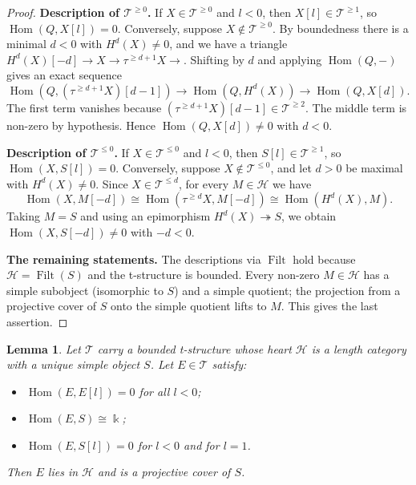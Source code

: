 \documentclass[11pt,reqno]{amsart}
\theoremstyle{plain}
\newtheorem{lemma}[theorem]{Lemma}
\theoremstyle{definition}
\theoremstyle{remark}
\newcommand{\kk}{\Bbbk}
\DeclareMathOperator{\Hom}{Hom}
\DeclareMathOperator{\Filt}{Filt}
\newcommand{\cH}{\mathcal{H}}
\newcommand{\cT}{\mathcal{T}}
\begin{document}
\begin{proof}
\textbf{Description of $\cT^{\ge0}$.} If $X\in\cT^{\ge0}$ and $l<0$, then $X[l]\in\cT^{\ge1}$, so $\Hom(Q,X[l])=0$. Conversely, suppose $X\notin\cT^{\ge0}$. By boundedness there is a minimal $d<0$ with $H^d(X)\ne0$, and we have a triangle $H^d(X)[-d]\to X\to\tau^{\ge d+1}X\to$. Shifting by $d$ and applying $\Hom(Q,-)$ gives an exact sequence
\[\Hom(Q,(\tau^{\ge d+1}X)[d-1])\to\Hom(Q,H^d(X))\to\Hom(Q,X[d]).\]
The first term vanishes because $(\tau^{\ge d+1}X)[d-1]\in\cT^{\ge2}$. The middle term is non-zero by hypothesis. Hence $\Hom(Q,X[d])\ne0$ with $d<0$.

\textbf{Description of $\cT^{\le0}$.} If $X\in\cT^{\le0}$ and $l<0$, then $S[l]\in\cT^{\ge1}$, so $\Hom(X,S[l])=0$. Conversely, suppose $X\notin\cT^{\le0}$, and let $d>0$ be maximal with $H^d(X)\ne0$. Since $X\in\cT^{\le d}$, for every $M\in\cH$ we have
\[\Hom(X,M[-d])\cong\Hom(\tau^{\ge d}X,M[-d])\cong\Hom(H^d(X),M).\]
Taking $M=S$ and using an epimorphism $H^d(X)\twoheadrightarrow S$, we obtain $\Hom(X,S[-d])\ne0$ with $-d<0$.

\textbf{The remaining statements.} The descriptions via $\Filt$ hold because $\cH=\Filt(S)$ and the t-structure is bounded. Every non-zero $M\in\cH$ has a simple subobject (isomorphic to $S$) and a simple quotient; the projection from a projective cover of $S$ onto the simple quotient lifts to $M$. This gives the last assertion.
\end{proof}

\begin{lemma}\label{lem:recognise-proj}
Let $\cT$ carry a bounded t-structure whose heart $\cH$ is a length category with a unique simple object $S$. Let $E\in\cT$ satisfy:
\begin{itemize}
\item $\Hom(E,E[l])=0$ for all $l<0$;
\item $\Hom(E,S)\cong\kk$;
\item $\Hom(E,S[l])=0$ for $l<0$ and for $l=1$.
\end{itemize}
Then $E$ lies in $\cH$ and is a projective cover of $S$.
\end{lemma}
\end{document}
